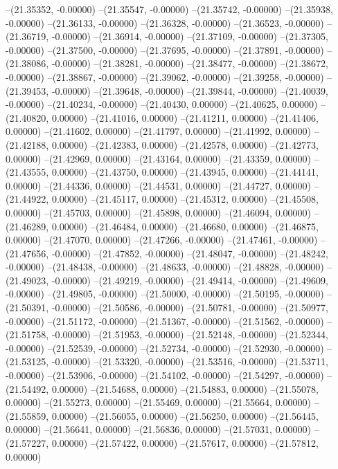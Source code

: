 --(21.35352, -0.00000)
--(21.35547, -0.00000)
--(21.35742, -0.00000)
--(21.35938, -0.00000)
--(21.36133, -0.00000)
--(21.36328, -0.00000)
--(21.36523, -0.00000)
--(21.36719, -0.00000)
--(21.36914, -0.00000)
--(21.37109, -0.00000)
--(21.37305, -0.00000)
--(21.37500, -0.00000)
--(21.37695, -0.00000)
--(21.37891, -0.00000)
--(21.38086, -0.00000)
--(21.38281, -0.00000)
--(21.38477, -0.00000)
--(21.38672, -0.00000)
--(21.38867, -0.00000)
--(21.39062, -0.00000)
--(21.39258, -0.00000)
--(21.39453, -0.00000)
--(21.39648, -0.00000)
--(21.39844, -0.00000)
--(21.40039, -0.00000)
--(21.40234, -0.00000)
--(21.40430, 0.00000)
--(21.40625, 0.00000)
--(21.40820, 0.00000)
--(21.41016, 0.00000)
--(21.41211, 0.00000)
--(21.41406, 0.00000)
--(21.41602, 0.00000)
--(21.41797, 0.00000)
--(21.41992, 0.00000)
--(21.42188, 0.00000)
--(21.42383, 0.00000)
--(21.42578, 0.00000)
--(21.42773, 0.00000)
--(21.42969, 0.00000)
--(21.43164, 0.00000)
--(21.43359, 0.00000)
--(21.43555, 0.00000)
--(21.43750, 0.00000)
--(21.43945, 0.00000)
--(21.44141, 0.00000)
--(21.44336, 0.00000)
--(21.44531, 0.00000)
--(21.44727, 0.00000)
--(21.44922, 0.00000)
--(21.45117, 0.00000)
--(21.45312, 0.00000)
--(21.45508, 0.00000)
--(21.45703, 0.00000)
--(21.45898, 0.00000)
--(21.46094, 0.00000)
--(21.46289, 0.00000)
--(21.46484, 0.00000)
--(21.46680, 0.00000)
--(21.46875, 0.00000)
--(21.47070, 0.00000)
--(21.47266, -0.00000)
--(21.47461, -0.00000)
--(21.47656, -0.00000)
--(21.47852, -0.00000)
--(21.48047, -0.00000)
--(21.48242, -0.00000)
--(21.48438, -0.00000)
--(21.48633, -0.00000)
--(21.48828, -0.00000)
--(21.49023, -0.00000)
--(21.49219, -0.00000)
--(21.49414, -0.00000)
--(21.49609, -0.00000)
--(21.49805, -0.00000)
--(21.50000, -0.00000)
--(21.50195, -0.00000)
--(21.50391, -0.00000)
--(21.50586, -0.00000)
--(21.50781, -0.00000)
--(21.50977, -0.00000)
--(21.51172, -0.00000)
--(21.51367, -0.00000)
--(21.51562, -0.00000)
--(21.51758, -0.00000)
--(21.51953, -0.00000)
--(21.52148, -0.00000)
--(21.52344, -0.00000)
--(21.52539, -0.00000)
--(21.52734, -0.00000)
--(21.52930, -0.00000)
--(21.53125, -0.00000)
--(21.53320, -0.00000)
--(21.53516, -0.00000)
--(21.53711, -0.00000)
--(21.53906, -0.00000)
--(21.54102, -0.00000)
--(21.54297, -0.00000)
--(21.54492, 0.00000)
--(21.54688, 0.00000)
--(21.54883, 0.00000)
--(21.55078, 0.00000)
--(21.55273, 0.00000)
--(21.55469, 0.00000)
--(21.55664, 0.00000)
--(21.55859, 0.00000)
--(21.56055, 0.00000)
--(21.56250, 0.00000)
--(21.56445, 0.00000)
--(21.56641, 0.00000)
--(21.56836, 0.00000)
--(21.57031, 0.00000)
--(21.57227, 0.00000)
--(21.57422, 0.00000)
--(21.57617, 0.00000)
--(21.57812, 0.00000)
